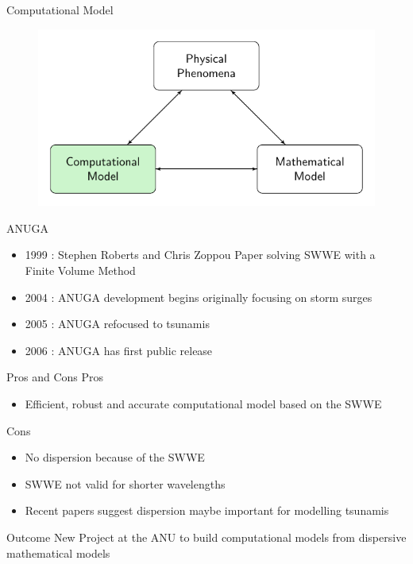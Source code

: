\documentclass[pdf]{beamer}
\begin{document}
\begin{frame}{Computational Model}
		\begin{figure}
			\includegraphics[width=\textwidth]{./Pics/ModelDiagrams/FlowChartHigh3G.pdf}
		\end{figure}
\end{frame}

\begin{frame}{ANUGA}
	\begin{itemize}
		\item 1999 : Stephen Roberts and Chris Zoppou Paper solving SWWE with a Finite Volume Method
		\item 2004 : ANUGA development begins originally focusing on storm surges
		\item 2005 : ANUGA refocused to tsunamis
		\item 2006 : ANUGA has first public release
	\end{itemize}
\end{frame}


\begin{frame}{Pros and Cons}
	Pros
	\begin{itemize}
	\item Efficient, robust and accurate computational model based on the SWWE
	\end{itemize}
	Cons
	\begin{itemize}
	\item No dispersion because of the SWWE
	\item SWWE not valid for shorter wavelengths
	\item Recent papers suggest dispersion maybe important for modelling tsunamis
	\end{itemize}
\end{frame}

\begin{frame}{Outcome}
 New Project at the ANU to build computational models from dispersive mathematical models
\end{frame}
\end{document}
